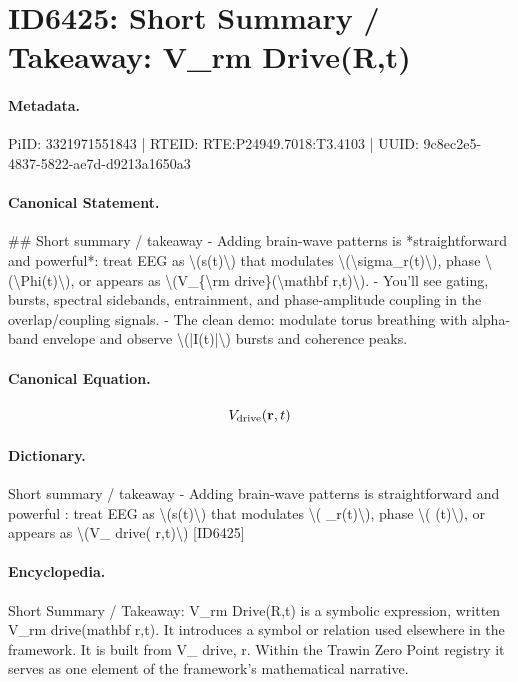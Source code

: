 \section*{ID6425: Short Summary / Takeaway: V\_rm Drive(R,t)}
\paragraph{Metadata.}
PiID: 3321971551843 | RTEID: RTE:P24949.7018:T3.4103 | UUID: 9c8ec2e5-4837-5822-ae7d-d9213a1650a3

\paragraph{Canonical Statement.}
\#\# Short summary / takeaway - Adding brain-wave patterns is *straightforward and powerful*: treat EEG as \textbackslash{}(s(t)\textbackslash{}) that modulates \textbackslash{}(\textbackslash{}sigma\_r(t)\textbackslash{}), phase \textbackslash{}(\textbackslash{}Phi(t)\textbackslash{}), or appears as \textbackslash{}(V\_\{\textbackslash{}rm drive\}(\textbackslash{}mathbf r,t)\textbackslash{}). - You’ll see gating, bursts, spectral sidebands, entrainment, and phase-amplitude coupling in the overlap/coupling signals. - The clean demo: modulate torus breathing with alpha-band envelope and observe \textbackslash{}(|I(t)|\textbackslash{}) bursts and coherence peaks.

\paragraph{Canonical Equation.}
\[
V_{\rm drive}(\mathbf r,t)
\]

\paragraph{Dictionary.}
Short summary / takeaway - Adding brain-wave patterns is straightforward and powerful : treat EEG as \textbackslash{}(s(t)\textbackslash{}) that modulates \textbackslash{}( \_r(t)\textbackslash{}), phase \textbackslash{}( (t)\textbackslash{}), or appears as \textbackslash{}(V\_ drive( r,t)\textbackslash{}) [ID6425]

\paragraph{Encyclopedia.}
Short Summary / Takeaway: V\_rm Drive(R,t) is a symbolic expression, written V\_rm drive(mathbf r,t). It introduces a symbol or relation used elsewhere in the framework. It is built from V\_ drive, r. Within the Trawin Zero Point registry it serves as one element of the framework's mathematical narrative.
